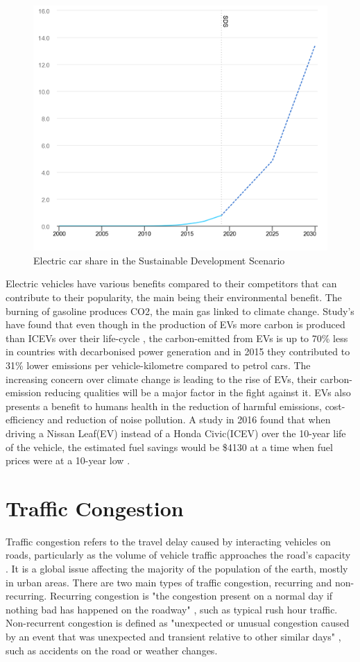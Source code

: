 \documentclass[11pt]{report}
\begin{document}
\begin{figure}[h!]
  \centering
  \includegraphics[width=0.55\linewidth]{electric-car-share-in-the-sustainable-development-scenario-2000-2030.png}
  \caption{Electric car share in the Sustainable Development Scenario \autocite{IEA2020EVReport}}
  \label{fig:1}
\end{figure}

Electric vehicles have various benefits compared to their competitors that can contribute to their popularity, the main being their environmental benefit. The burning of gasoline produces CO2, the main gas linked to climate change. Study's have found that even though in the production of EVs more carbon is produced than ICEVs over their life-cycle \autocite{hampshire2018electric}, the carbon-emitted from EVs is up to 70\% less in countries with decarbonised power generation and in 2015 they contributed to 31\% lower emissions per vehicle-kilometre compared to petrol cars\autocite{knobloch2020net}. The increasing concern over climate change is leading to the rise of EVs, their carbon-emission reducing qualities will be a major factor in the fight against it. EVs also presents a benefit to humans health in the reduction of harmful emissions, cost-efficiency and reduction of noise pollution. A study in 2016 found that when driving a Nissan Leaf(EV) instead of a Honda Civic(ICEV) over the 10-year life of the vehicle, the estimated fuel savings would be \$4130 at a time when fuel prices were at a 10-year low \autocite{malmgren2016quantifying}.

\section{Traffic Congestion}

Traffic congestion refers to the travel delay caused by interacting vehicles on roads, particularly as the volume of vehicle traffic approaches the road's capacity \autocite{litman2016smart}. It is a global issue affecting the majority of the population of the earth, mostly in urban areas. There are two main types of traffic congestion, recurring and non-recurring. Recurring congestion is "the congestion present on a normal day if nothing bad has happened on the roadway" \autocite{hallenbeck2003measurement}, such as typical rush hour traffic. Non-recurrent congestion is defined as "unexpected or unusual congestion caused by an event that was unexpected and transient relative to other similar days" \autocite{hallenbeck2003measurement}, such as accidents on the road or weather changes.
\end{document}
